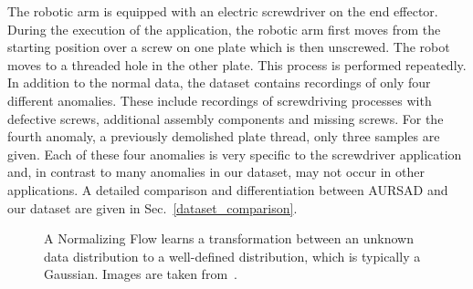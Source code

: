 \documentclass[journal]{IEEEtran}
\begin{document}
The robotic arm is equipped with an electric screwdriver on the end effector. 
During the execution of the application, the robotic arm first moves from the starting position over a screw on one plate which is then unscrewed.
The robot moves to a threaded hole in the other plate.
This process is performed repeatedly.
In addition to the normal data, the dataset contains recordings of only four different anomalies.
These include recordings of screwdriving processes with defective screws, additional assembly components and missing screws.
For the fourth anomaly, a previously demolished plate thread, only three samples are given.
Each of these four anomalies is very specific to the screwdriver application and, in contrast to many anomalies in our dataset, may not occur in other applications.
A detailed comparison and differentiation between AURSAD and our dataset are given in Sec.~\ref{dataset_comparison}.
\begin{figure}
\centering
{}
    \caption{A Normalizing Flow learns a transformation between an unknown data distribution to a well-defined distribution, which is typically a Gaussian. Images are taken from~\cite{realnvp}.
    }
    \label{fig:nf_transform}
\end{figure}
\end{document}
